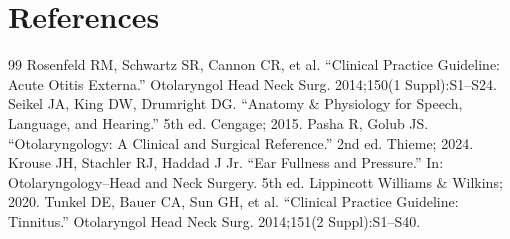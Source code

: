 \section*{References}
\begin{thebibliography}{99}
 Rosenfeld RM, Schwartz SR, Cannon CR, et al. ``Clinical Practice Guideline: Acute Otitis Externa.'' Otolaryngol Head Neck Surg. 2014;150(1 Suppl):S1--S24.
 Seikel JA, King DW, Drumright DG. ``Anatomy \& Physiology for Speech, Language, and Hearing.'' 5th ed. Cengage; 2015.
 Pasha R, Golub JS. ``Otolaryngology: A Clinical and Surgical Reference.'' 2nd ed. Thieme; 2024.
 Krouse JH, Stachler RJ, Haddad J Jr. ``Ear Fullness and Pressure.'' In: Otolaryngology--Head and Neck Surgery. 5th ed. Lippincott Williams \& Wilkins; 2020.
 Tunkel DE, Bauer CA, Sun GH, et al. ``Clinical Practice Guideline: Tinnitus.'' Otolaryngol Head Neck Surg. 2014;151(2 Suppl):S1--S40.
\end{thebibliography}
